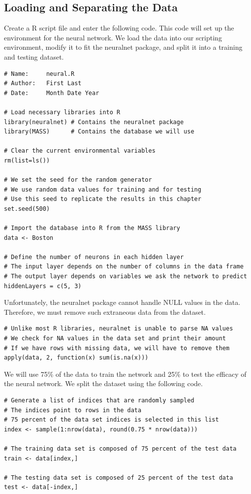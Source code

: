 \subsection{Loading and Separating the Data}
Create a R script file and enter the following code. This code will set up the environment for the neural network. We load the data into our scripting environment, modify it to fit the neuralnet package, and split it into a training and testing dataset. 
\begin{lstlisting}
# Name:     neural.R
# Author:   First Last
# Date:     Month Date Year

# Load necessary libraries into R
library(neuralnet) # Contains the neuralnet package
library(MASS)      # Contains the database we will use

# Clear the current environmental variables
rm(list=ls())

# We set the seed for the random generator
# We use random data values for training and for testing
# Use this seed to replicate the results in this chapter
set.seed(500)

# Import the database into R from the MASS library
data <- Boston

# Define the number of neurons in each hidden layer
# The input layer depends on the number of columns in the data frame
# The output layer depends on variables we ask the network to predict
hiddenLayers = c(5, 3)
\end{lstlisting}

Unfortunately, the neuralnet package cannot handle NULL values in the data. Therefore, we must remove such extraneous data from the dataset.

\begin{lstlisting}
# Unlike most R libraries, neuralnet is unable to parse NA values
# We check for NA values in the data set and print their amount
# If we have rows with missing data, we will have to remove them
apply(data, 2, function(x) sum(is.na(x)))
\end{lstlisting}

We will use 75\% of the data to train the network and 25\% to test the efficacy of the neural network. We split the dataset using the following code.

\begin{lstlisting}
# Generate a list of indices that are randomly sampled
# The indices point to rows in the data
# 75 percent of the data set indices is selected in this list
index <- sample(1:nrow(data), round(0.75 * nrow(data)))

# The training data set is composed of 75 percent of the test data
train <- data[index,]

# The testing data set is composed of 25 percent of the test data
test <- data[-index,]
\end{lstlisting}

